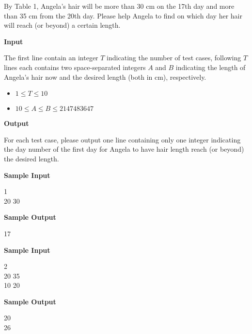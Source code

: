 By Table 1, Angela's hair will be more than 30 cm on the 17th day and more than 35 cm from the 20th day. Please help Angela to find on which day her hair will reach (or beyond) a certain length.

\begin{flushleft}
{\color{red} \textbf{Input}}
\end{flushleft}
The first line contain an integer $T$ indicating the number of test cases, following $T$ lines each contains two space-separated integers $A$ and $B$ indicating the length of Angela's hair now and the desired length (both in cm), respectively.
\begin{itemize}
\item $1 \leq T \leq 10$
\item $10 \leq A \leq B \leq 2147483647$
\end{itemize}

\begin{flushleft}
{\color{red} \textbf{Output}}
\end{flushleft}
For each test case, please output one line containing only one integer indicating the day number of the first day for Angela to have hair length reach (or beyond) the desired length.

\begin{flushleft}
{\color{red} \textbf{Sample Input}}
\end{flushleft}
\begin{flushleft}
1\\
20 30\\
\end{flushleft}

\begin{flushleft}
{\color{red} \textbf{Sample Output}}
\end{flushleft}
\begin{flushleft}
17\\
\end{flushleft}

\begin{flushleft}
{\color{red} \textbf{Sample Input}}
\end{flushleft}
\begin{flushleft}
2\\
20 35\\
10 20\\
\end{flushleft}

\begin{flushleft}
{\color{red} \textbf{Sample Output}}
\end{flushleft}
\begin{flushleft}
20\\
26\\
\end{flushleft}

\newpage